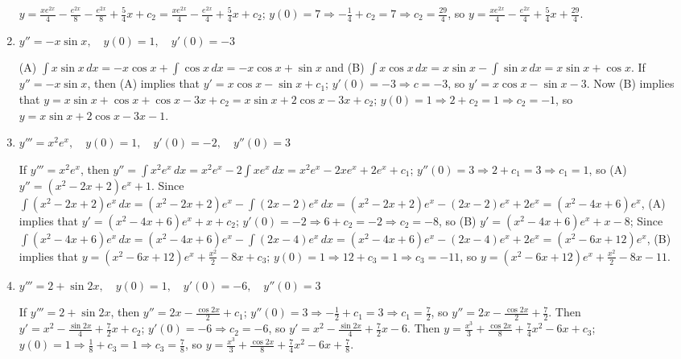 \documentclass{ximera}
\begin{document}
\begin{problem}
\begin{enumerate}
\begin{solution}
$y=\frac{xe^{2x}}{4}-\frac{e^{2x}}{8}-\frac{e^{2x}}{8}+\frac{5}{4}x+c_2
=\frac{xe^{2x}}{4}-\frac{e^{2x}}{4}+\frac{5}{4}x+c_2$; $y(0)=7
\Rightarrow-\frac{1}{4}+c_2=7\Rightarrow c_2=\frac{29}{4}$, so
$y=\frac{xe^{2x}}{4}-\frac{e^{2x}}{4}+\frac{5}{4}x+\frac{29}{4}$.
\end{solution}

\item %
$y''=- x \sin x, \quad y(0)=1, \quad y'(0)=-3$



\begin{solution}
   (A) $\int x\sin x\,dx=-x\cos x+\int \cos x\,dx=-x\cos x+\sin
x$ and (B) $\int x\cos x\,dx=x\sin x-\int\sin x\,dx=x\sin x+\cos x$.
If $y''=-x\sin x$, then (A) implies that $y'=x\cos x-\sin x+c_1$;
$y'(0)=-3\Rightarrow c=-3$, so $y'=x\cos x-\sin x-3$. Now (B) implies
that $y=x\sin x+\cos x+\cos x-3x+c_2=x\sin x+2\cos x-3x+c_2$;
$y(0)=1\Rightarrow 2+c_2=1\Rightarrow c_2=-1$, so $y=x \sin x+2 \cos x-3x-1$.
\end{solution}

\item %
$y'''=x^2e^x, \quad y(0)=1, \quad y'(0)=-2, \quad
y''(0)=3$



\begin{solution}
    If $y'''=x^2e^x$, then $y''=\int x^2e^x\,dx=x^2e^x-2\int
xe^x\,dx=x^2e^x-2xe^x+2e^x+c_1$; $y''(0)=3\Rightarrow
2+c_1=3\Rightarrow c_1=1$, so (A) $y''=(x^2-2x+2)e^x+1$. Since $\int
(x^2-2x+2)e^x\,dx=(x^2-2x+2)e^x-\int (2x-2)e^x\,dx
=(x^2-2x+2)e^x-(2x-2)e^x+2e^x=(x^2-4x+6)e^x$, (A) implies that
$y'=(x^2-4x+6)e^x+x+c_2$; $y'(0)=-2\Rightarrow 6+c_2=-2\Rightarrow
c_2=-8$, so (B) $y'=(x^2-4x+6)e^x+x-8$; Since $\int
(x^2-4x+6)e^x\,dx=(x^2-4x+6)e^x-\int (2x-4)e^x\,dx
=(x^2-4x+6)e^x-(2x-4)e^x+2e^x=(x^2-6x+12)e^x$, (B) implies that
$y=(x^2-6x+12)e^x+\frac{x^2}{2}-8x+c_3$; $y(0)=1\Rightarrow
12+c_3=1\Rightarrow c_3=-11$, so
$y=(x^2-6x+12)e^x+\frac{x^2}{2}-8x-11$.
\end{solution}

\item %
$y'''=2+\sin 2x, \quad y(0)=1, \quad y'(0)=-6, \quad
y''(0)=3$



\begin{solution}
    If $y'''=2+\sin2x$, then $y''=2x-\frac{\cos 2x}{2}+c_1$;
$y''(0)=3\Rightarrow -\frac{1}{2}+c_1=3\Rightarrow c_1=\frac{7}{2}$, so $y''=2x-\frac{\cos 2x}{2}+\frac{7}{2}$. Then
$y'=x^2-\frac{\sin 2x}{4}+\frac{7}{2}x+c_2$; $y'(0)=-6\Rightarrow
c_2=-6$, so $y'=x^2-\frac{\sin 2x}{4}+\frac{7}{2}x-6$. Then
$y=\frac{x^3}{3}+\frac{\cos 2x}{8}+\frac{7}{4}x^2-6x+c_3$;
$y(0)=1\Rightarrow \frac{1}{8}+c_3=1\Rightarrow c_3=\frac{7}{8}$, so $y=\frac{x^3}{3}+\frac{\cos 2x}{8}+
\frac{7}{4}x^2-6x+\frac{7}{8}$.
\end{solution}


\end{enumerate}
\end{problem}
\end{document}
